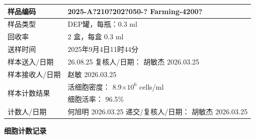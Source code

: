 \documentclass[UTF8,10pt,a4paper,fontset=fandol]{ctexart}
\renewcommand{\arraystretch}{1.15}
\newcommand{\fieldvalue}[1]{#1}
\newcommand{\handwritten}[1]{#1}
\begin{document}
\renewcommand{\arraystretch}{1.35}
\begin{tabularx}{\textwidth}{|p{}|X|}
\hline
样品编码 &
\fieldvalue{\handwritten{2025-A?210?202?050-? Farming-4200?}}
\\ \hline
样品类型 &
\fieldvalue{DEP罐，每瓶：0.3 ml}
\\ \hline
回收率 &
\fieldvalue{\handwritten{2}} 盒，每盒 0.3 ml
\\ \hline
送样时间 &
\fieldvalue{\handwritten{2025年9月4日11时44分}}
\\ \hline
样本送入/日期 &
\fieldvalue{\handwritten{26.08.25}}
\qquad
复核人/日期：
\fieldvalue{\handwritten{胡敏杰 2026.03.25}}
\\ \hline
样本接收人/日期 &
\fieldvalue{\handwritten{赵敏 2026.03.25}}
\\ \hline
\multirow{2}{*}{样本计数结果} &
活细胞密度：
\fieldvalue{\handwritten{8.9}}\(\times 10^{6}\) cells/ml
\\[-1mm]
& 细胞活率：
\fieldvalue{\handwritten{96.5}}\%
\\ \hline
计数人/日期 &
\fieldvalue{\handwritten{何旭明 2026.03.25}}
\qquad
递交/复核人/日期：
\fieldvalue{\handwritten{胡敏杰 2026.03.25}}
\\ \hline
\end{tabularx}

\vspace{3mm}
\begin{center}
\textbf{细胞计数记录}
\end{center}
\end{document}
